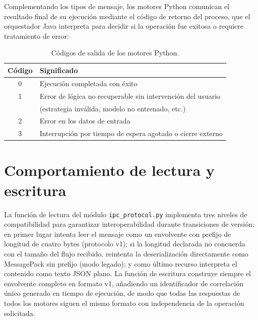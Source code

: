 Complementando los tipos de mensaje, los motores Python comunican el resultado final de su ejecución mediante el código de retorno del proceso, que el orquestador Java interpreta para decidir si la operación fue exitosa o requiere tratamiento de error:

\begin{table}[h]
\centering
\caption{Códigos de salida de los motores Python.}
\label{tab:exit-codes}
\begin{tabular}{@{}cl@{}}
\toprule
\textbf{Código} & \textbf{Significado} \\
\midrule
0 & Ejecución completada con éxito \\
1 & Error de lógica no recuperable sin intervención del usuario \\
  & (estrategia inválida, modelo no entrenado, etc.) \\
2 & Error en los datos de entrada \\
3 & Interrupción por tiempo de espera agotado o cierre externo \\
\bottomrule
\end{tabular}
\end{table}

\section*{Comportamiento de lectura y escritura}

La función de lectura del módulo \texttt{ipc\_protocol.py} implementa tres niveles de compatibilidad para garantizar interoperabilidad durante transiciones de versión: en primer lugar intenta leer el mensaje como un envolvente con prefijo de longitud de cuatro bytes (protocolo v1); si la longitud declarada no concuerda con el tamaño del flujo recibido, reintenta la deserialización directamente como MessagePack sin prefijo (modo legado); y como último recurso interpreta el contenido como texto JSON plano. La función de escritura construye siempre el envolvente completo en formato v1, añadiendo un identificador de correlación único generado en tiempo de ejecución, de modo que todas las respuestas de todos los motores siguen el mismo formato con independencia de la operación solicitada.
